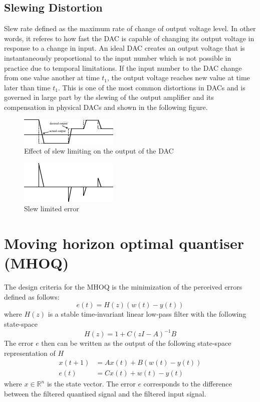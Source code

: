\documentclass[a4paper]{article}
\begin{document}
\subsection{Slewing Distortion}
Slew rate defined as the maximum rate of change of output voltage level. In other words, it referes to how fast the DAC is capable of changing its output voltage in response to a change in input. 
An ideal DAC creates an output voltage that is instantaneously proportional to the input number which is not possible in practice due to temporal limitations.  If the input number to the DAC change from one value another at time $t_{1}$, the output voltage reaches new value at time later than time $t_{1}$. This is one of the most common distortions in DACs and is governed in large part by the slewing of the output amplifier and its compensation in physical DACs and shown in the following figure. 
\begin{figure}[!ht]
	\centering
		\includegraphics[scale = 2.5]{figures/effectofslew.pdf}
		\caption{Effect of slew limiting on the output of the DAC}
		\label{fig:slew1}
\end{figure}
\begin{figure}[!ht]
	\centering
		\includegraphics[scale = 2.5]{figures/slewlimitederror.pdf}
		\caption{Slew limited error}
		\label{fig:slew2}
\end{figure}
\section{Moving horizon optimal quantiser (MHOQ)}
The design criteria for the MHOQ is the minimization of the perceived errors defined as follows:
\begin{equation}
	e(t) = H(z)(w(t)-y(t))
	\label{eq:error1}
\end{equation}
where  $H(z)$  is  a stable time-invariant linear low-pass filter with the following state-space
\begin{equation}
	\label{eq:filter_statespace}
	H(z) = 1 + C(z I - A)^{-1} B
\end{equation}
The error $e$  then can be written as the output of the following state-space representation of $H$
\begin{equation}
	\begin{aligned}
		x(t+1) &= A x(t) + B (w(t)-y(t))		\\
		e(t) &= Cx(t) + w(t)-y(t)
	\end{aligned}
	\label{eq:statespace1}
\end{equation}
where $x \in \mathbb{R}^{n}$ is the state vector.  The error $e$ corresponds to the difference between the filtered quantised signal and the filtered input signal. 
\end{document}
